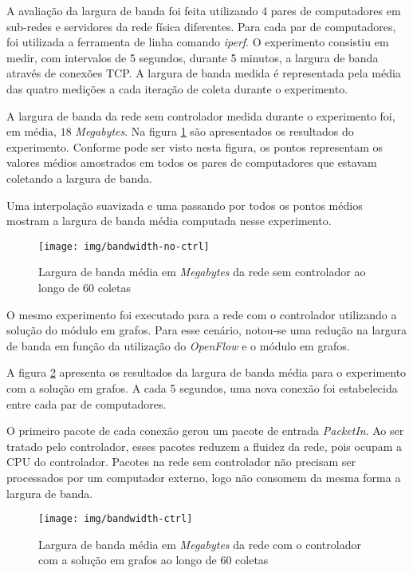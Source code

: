 A avaliação da largura de banda foi feita utilizando 4 pares de computadores
em sub-redes e servidores da rede física diferentes.
Para cada par de computadores, foi utilizada a ferramenta de linha comando
\emph{iperf}.
O experimento consistiu em medir, com intervalos de 5 segundos, durante
5 minutos, a largura de banda através de conexões TCP.
A largura de banda medida é representada pela média das quatro medições a
cada iteração de coleta durante o experimento.

A largura de banda da rede sem controlador medida durante o experimento foi,
em média, $18$ \emph{Megabytes}.
Na figura \ref{fig:bandwidth-no-ctrl} são apresentados os resultados do
experimento.
Conforme pode ser visto nesta figura, os pontos representam os valores
médios amostrados em todos os pares de computadores que estavam coletando
a largura de banda.

\break

Uma interpolação suavizada e uma passando por todos os pontos médios mostram
a largura de banda média computada nesse experimento.

\begin{figure}[!htb]
    \centering
    \label{fig:bandwidth-no-ctrl}
    \texttt{[image: img/bandwidth-no-ctrl]}
    \caption{Largura de banda média em \emph{Megabytes} da rede sem
    controlador ao longo de 60 coletas}
\end{figure}

O mesmo experimento foi executado para a rede com o controlador utilizando
a solução do módulo em grafos.
Para esse cenário, notou-se uma redução na largura de banda em função da
utilização do \emph{OpenFlow} e o módulo em grafos.

A figura \ref{fig:bandwidth-ctrl} apresenta os resultados da largura de banda
média para o experimento com a solução em grafos.
A cada 5 segundos, uma nova conexão foi estabelecida entre cada par de
computadores.

O primeiro pacote de cada conexão gerou um pacote de entrada \emph{PacketIn}.
Ao ser tratado pelo controlador, esses pacotes reduzem a fluidez da rede, pois
ocupam a CPU do controlador.
Pacotes na rede sem controlador não precisam ser processados por um computador
externo, logo não consomem da mesma forma a largura de banda.

\break

\begin{figure}[!htb]
    \centering
    \label{fig:bandwidth-ctrl}
    \texttt{[image: img/bandwidth-ctrl]}
    \caption{Largura de banda média em \emph{Megabytes} da rede com o
        controlador com a solução em grafos ao longo de 60 coletas}
\end{figure}

